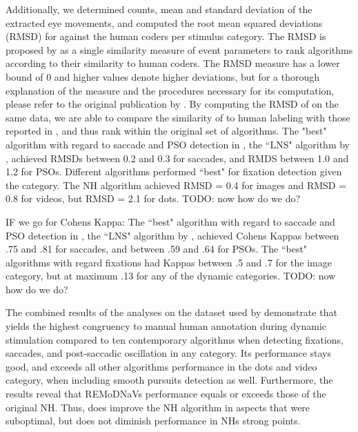 Additionally, we determined counts, mean and standard deviation of the extracted eye movements, and computed the root
mean squared deviations (RMSD) for \remodnav against the human coders per stimulus category. The RMSD is proposed by
\cite{Andersson2017} as a single similarity measure of event parameters to rank algorithms according to their
similarity to human coders. The RMSD measure has a lower bound of 0 and higher values denote higher deviations,
but for a thorough explanation of the measure and the procedures necessary for its computation, please refer to the
original publication by \cite{Andersson2017}. By computing the RMSD of \remodnav on the same data, we are able to
compare the similarity of \remodnav to human labeling with those reported in \cite{Andersson2017}, and thus rank
\remodnav within the original set of algorithms. 
The "best" algorithm with regard to saccade and PSO detection in \cite{Andersson2017}, the ``LNS" algorithm by
\cite{Larsson2013}, achieved RMSDs between 0.2 and 0.3 for saccades, and RMDS between 1.0 and 1.2 for PSOs. Different
algorithms performed ``best" for fixation detection given the category. The NH algorithm achieved RMSD = 0.4 for
images and RMSD = 0.8 for videos, but RMSD = 2.1 for dots. TODO: now how do we do?

IF we go for Cohens Kappa: The ``best" algorithm with regard to saccade and PSO detection in \cite{Andersson2017}, the
``LNS" algorithm by \cite{Larsson2013}, achieved Cohens Kappas between .75 and .81 for saccades, and between .59 and
.64 for PSOs. The ``best" algorithms with regard fixations had Kappas between .5 and .7 for the image category, but
at maximum .13 for any of the dynamic categories. TODO: now how do we do?


The combined results of the analyses on the dataset used by \citet{Andersson2017} demonstrate that \remodnav yields
the highest congruency to manual human annotation during dynamic stimulation compared to ten contemporary
algorithms when detecting fixations, saccades, and post-saccadic oscillation in any category. Its performance
stays good, and exceeds all other algorithms performance in the dots and video category, when including smooth
pursuits detection as well. Furthermore, the results reveal that REMoDNaVs performance equals or exceeds those of
the original NH. Thus, \remodnav does improve the NH algorithm in aspects that were suboptimal, but does not
diminish performance in NHs strong points.


